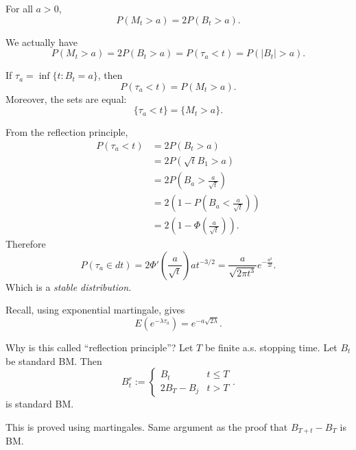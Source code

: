 \begin{theorem}
	For all $a > 0$,
	\[
		P(M_t > a) = 2 P(B_t > a) 
	.\] 
\end{theorem}
We actually have
\[
		P(M_t > a) = 2 P(B_t > a) = P(\tau_a< t)= P(|B_t| > a)
	.\]
\begin{remark}
	
	If $\tau_a = \inf \{t: B_t = a\} $, then
	\[
		P(\tau_a < t) = P(M_t > a)
	.\] 
	Moreover, the sets are equal:
	\[
		\{\tau_a < t\}  = \{M_t > a\} 
	.\] 


From the reflection principle,
\begin{align*}
	P(\tau_a < t) &= 2 P(B_t > a)\\
	&= 2 P(\sqrt{t} B_1 > a) \\
	&= 2 P\left( B_a > \frac{a}{\sqrt{t} } \right)  \\
	&= 2\left( 1 - P\left( B_a < \frac{a}{\sqrt{t} } \right)  \right)  \\
	&= 2\left( 1 - \Phi\left( \frac{a}{\sqrt{t} } \right)  \right)  
.\end{align*}
Therefore
\[
	P\left( \tau_a \in dt  \right) 
	= 2 \Phi'\left( \frac{a}{\sqrt{t} } \right) a t^{- 3 / 2}
	= \frac{a}{\sqrt{2 \pi t^3} } e^{- \frac{a^2}{2t}}
.\] 
Which is a \textit{stable distribution.}


\end{remark}

\begin{remark}
	Recall, using exponential martingale, gives
	\[
		E\left( e^{- \lambda \tau_a} \right) 
		= e^{- a \sqrt{2 \lambda} }
	.\] 
\end{remark}

\begin{intuition}
	Why is this called ``reflection principle''? 
	Let $T$ be finite a.s. stopping time. Let $B_t$ be standard BM. Then 
	\[
		B_t^r := \begin{cases}
			B_t & t \le T \\
			2 B_T - B_j & t > T
		\end{cases}
	.\] 
	is standard BM.
	
	This is proved using martingales.
	Same argument as the proof that $B_{T + t} - B_T$ is BM.
	
\end{intuition}

